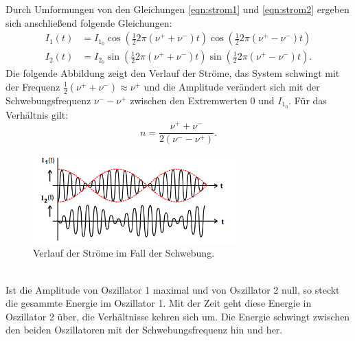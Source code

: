  Durch Umformungen von den Gleichungen \eqref{eqn:strom1} und \eqref{eqn:strom2} ergeben sich anschließend folgende Gleichungen:
 \begin{align}
   I_1(t)&=I_{1_0}\cos\left(\frac{1}{2}2\pi(\nu^{+}+\nu^{-})t\right)\cos\left(\frac{1}{2}2\pi(\nu^{+}-\nu^{-})t\right)\\
   I_2(t)&=I_{2_0}\sin\left(\frac{1}{2}2\pi(\nu^{+}+\nu^{-})t\right)\sin\left(\frac{1}{2}2\pi(\nu^{+}-\nu^{-})t\right).
  \end{align}
\newpage
Die folgende Abbildung zeigt den Verlauf der Ströme, das System schwingt mit der Frequenz $\frac{1}{2}(\nu^{+}+\nu^{-})\approx\nu^{+}$
und die Amplitude verändert sich mit der Schwebungsfrequenz $\nu^{-}-\nu^{+}$ zwischen den Extremwerten 0 und $I_{1_0}$. Für das Verhältnis gilt:\\
  \begin{equation}
    n=\frac{\nu^+ + \nu^-}{2(\nu^{-} - \nu^{+})}\label{eqn:verhaeltnis}.
  \end{equation}
  \begin{figure}[!h]
    \centering
    \includegraphics[width=0.7\textwidth]{schwebung.PNG}
    \caption{Verlauf der Ströme im Fall der Schwebung\cite{skript}.}
    \label{abb:schwebung}
    \end{figure}
\\
  Ist die Amplitude von Oszillator 1 maximal und von Oszillator 2 null, so steckt die gesammte Energie im Oszillator 1.
  Mit der Zeit geht diese Energie in Oszillator 2 über, die Verhältnisse kehren sich um. Die Energie schwingt zwischen den beiden Oszillatoren mit der Schwebungsfrequenz hin und her.\\
